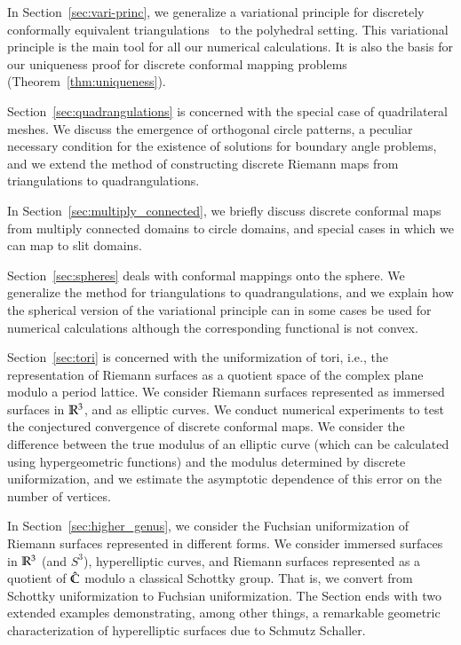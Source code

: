 \documentclass[Thesis]{subfiles}
\begin{document}
In Section~\ref{sec:vari-princ}, we generalize a variational principle
for discretely conformally equivalent
triangulations~\cite{BPS2015:dconf} to the polyhedral setting. This
variational principle is the main tool for all our numerical
calculations. It is also the basis for our uniqueness proof for
discrete conformal mapping problems
(Theorem~\ref{thm:uniqueness}). 

Section~\ref{sec:quadrangulations} is concerned with the special case
of quadrilateral meshes. We discuss the emergence of
orthogonal circle patterns, a peculiar necessary condition for the
existence of solutions for boundary angle problems, and we extend the
method of constructing discrete Riemann maps from triangulations to
quadrangulations.

In Section~\ref{sec:multiply_connected}, we briefly discuss discrete
conformal maps from multiply connected domains to circle domains, and
special cases in which we can map to slit domains. 

Section~\ref{sec:spheres} deals with conformal mappings onto the
sphere. We generalize the method for triangulations to
quadrangulations, and we explain how the spherical version of the
variational principle can in some cases be used for numerical
calculations although the corresponding functional is not convex.

Section~\ref{sec:tori} is concerned with the uniformization of tori,
i.e., the representation of Riemann surfaces as a quotient space of
the complex plane modulo a period lattice. We consider Riemann
surfaces represented as immersed surfaces in $\mathbb R^{3}$, and as elliptic
curves. We conduct numerical experiments to test the conjectured
convergence of discrete conformal maps. We consider the difference
between the true modulus of an elliptic curve (which can be calculated
using hypergeometric functions) and the modulus determined by discrete
uniformization, and we estimate the asymptotic dependence of this
error on the number of vertices.

In Section~\ref{sec:higher_genus}, we consider the Fuchsian
uniformization of Riemann surfaces represented in different forms. We
consider immersed surfaces in $\mathbb R^{3}$ (and $S^{3}$), hyperelliptic
curves, and Riemann surfaces represented as a quotient of $\hat{\mathbb C}$
modulo a classical Schottky group. That is, we convert from Schottky
uniformization to Fuchsian uniformization. The Section ends with two
extended examples demonstrating, among other things, a remarkable
geometric characterization of hyperelliptic surfaces due to Schmutz
Schaller.
\end{document}
